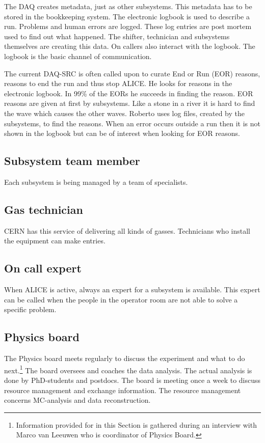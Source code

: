 The DAQ creates metadata, just as other subsystems. This metadata has to be stored in the bookkeeping system. The electronic logbook is used to describe a run. Problems and human errors are logged. These log entries are post mortem used to find out what happened. The shifter, technician and subsystems themselves are creating this data. On callers also interact with the logbook. The logbook is the basic channel of communication.


The current DAQ-SRC is often called upon to curate End or Run (EOR) reasons, reasons to end the run and thus stop ALICE. He looks for reasons in the electronic logbook. In 99\% of the EORs he succeeds in finding the reason. EOR reasons are given at first by subsystems. Like a stone in a river it is hard to find the wave which causes the other waves. Roberto uses log files, created by the subsystems, to find the reasons. When an error occurs outside a run then it is not shown in the logbook but can be of interest when looking for EOR reasons. 

\subsection{Subsystem team member}
Each subsystem is being managed by a team of specialists. 

\subsection{Gas technician}
CERN has this service of delivering all kinds of gasses. Technicians who install the equipment can make entries.

\subsection{On call expert}
When ALICE is active, always an expert for a subsystem is available. This expert can be called when the people in the operator room are not able to solve a specific problem.

\subsection{Physics board}
The Physics board meets regularly to discuss the experiment and what to do next.\footnote{Information provided for in this Section is gathered during an interview with Marco van Leeuwen who is coordinator of Physics Board.} The board oversees and coaches the data analysis. The actual analysis is done by PhD-students and postdocs. The board is meeting once a week to discuss resource management and exchange information. The resource management concerns MC-analysis and data reconstruction. 

